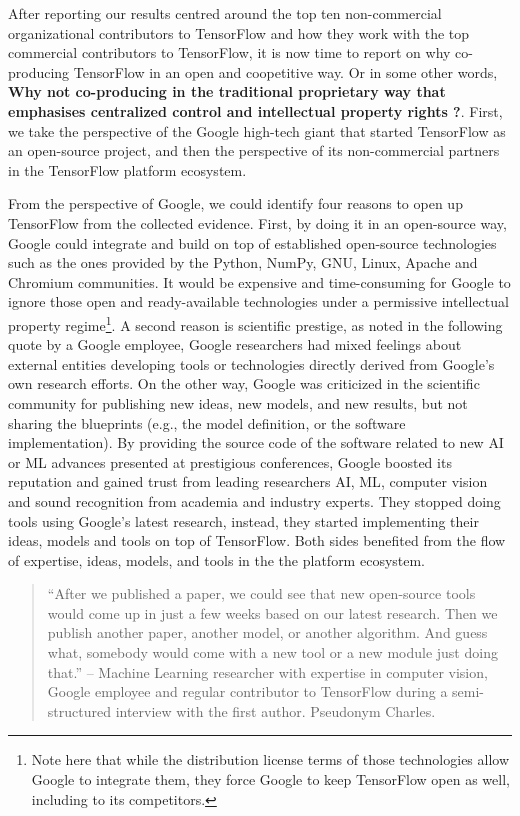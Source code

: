 \documentclass[CHICAGO,Times1COL]{WileyNJDv5} %
\begin{document}
After reporting our results centred around the top ten non-commercial organizational contributors to TensorFlow and how they work with the top commercial contributors to TensorFlow, it is now time to report on why co-producing TensorFlow in an open and coopetitive way.  Or in some other words,  \textbf{Why not co-producing in the traditional proprietary way that emphasises centralized control and intellectual property rights ?}. First, we take the perspective of the Google high-tech giant that started TensorFlow as an open-source project, and then the perspective of its non-commercial partners in the TensorFlow platform ecosystem. 



From the perspective of Google, we could identify four reasons to open up TensorFlow from the collected evidence. First, 
by doing it in an open-source way, Google could integrate and build on top of established open-source technologies such as the ones provided by the Python, NumPy, GNU, Linux, Apache and Chromium communities. It would be expensive and time-consuming for Google to ignore those open and ready-available technologies under a permissive intellectual property regime\footnote{Note here that while the distribution license terms of those technologies allow Google to integrate them, they force Google to keep TensorFlow open as well, including to its competitors.}. A second reason is scientific prestige, as noted in the following quote by a Google employee, Google researchers had mixed feelings about external entities developing tools or technologies directly derived from Google's own research efforts. On the other way, Google was criticized in the scientific community for publishing new ideas, new models, and new results, but not sharing the blueprints (e.g., the model definition, or the software implementation). By providing the source code of the software related to new \ac{AI} or \ac{ML} advances presented at prestigious conferences, Google boosted its reputation and gained trust from leading researchers \ac{AI}, \ac{ML}, computer vision and sound recognition from academia and industry experts. They stopped doing tools using Google's latest research, instead, they started implementing their ideas, models and tools on top of TensorFlow. Both sides benefited from the flow of expertise, ideas, models, and tools in the the platform ecosystem. 

\begin{quotation}
``After we published a paper, we could see that new open-source tools would come up in just a few weeks based on our latest research. Then we publish another paper, another model, or another algorithm. And guess what, somebody would come with a new tool or a new module just doing that.'' -- Machine Learning researcher with expertise in computer vision, Google employee and regular contributor to TensorFlow during a semi-structured interview with the first author.  Pseudonym Charles.
\end{quotation}
\end{document}
